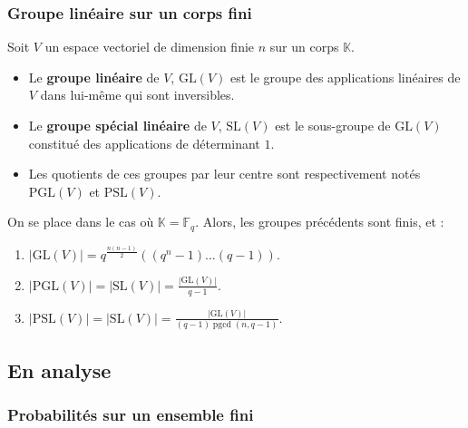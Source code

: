   \subsubsection{Groupe linéaire sur un corps fini}


  Soit $V$ un espace vectoriel de dimension finie $n$ sur un corps $\mathbb{K}$.

  \begin{definition}
    \begin{itemize}
      \item Le \textbf{groupe linéaire} de $V$, $\mathrm{GL}(V)$ est le groupe des applications linéaires de $V$ dans lui-même qui sont inversibles.
      \item Le \textbf{groupe spécial linéaire} de $V$, $\mathrm{SL}(V)$ est le sous-groupe de $\mathrm{GL}(V)$ constitué des applications de déterminant $1$.
      \item Les quotients de ces groupes par leur centre sont respectivement notés $\mathrm{PGL}(V)$ et $\mathrm{PSL}(V)$.
    \end{itemize}
  \end{definition}


  \begin{proposition}
    On se place dans le cas où $\mathbb{K} = \mathbb{F}_q$. Alors, les groupes précédents sont finis, et :
    \begin{enumerate}[label=(\roman*)]
      \item $|\mathrm{GL}(V)| = q^{\frac{n(n-1)}{2}}((q^n-1) \dots (q-1))$.
      \item $|\mathrm{PGL}(V)| = |\mathrm{SL}(V)| = \frac{|\mathrm{GL}(V)|}{q-1}$.
      \item $|\mathrm{PSL}(V)| = |\mathrm{SL}(V)| = \frac{|\mathrm{GL}(V)|}{(q-1)\operatorname{pgcd}(n,q-1)}$.
    \end{enumerate}
  \end{proposition}

  \subsection{En analyse}

  \subsubsection{Probabilités sur un ensemble fini}

